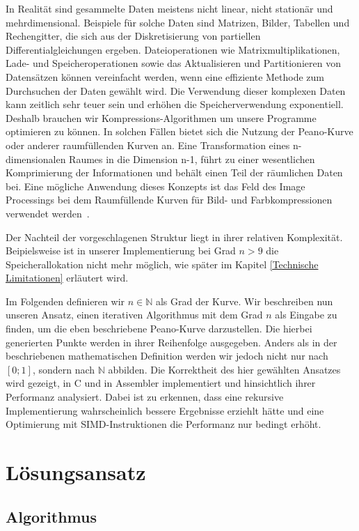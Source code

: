 \documentclass[course=asp]{aspdoc}
\begin{document}
In Realit\"at sind gesammelte Daten meistens nicht linear, nicht station\"ar und mehrdimensional. Beispiele f\"ur solche Daten sind Matrizen, Bilder, Tabellen und Rechengitter, die sich aus der Diskretisierung von partiellen Differentialgleichungen ergeben. Dateioperationen wie Matrixmultiplikationen, Lade- und Speicheroperationen sowie das Aktualisieren und Partitionieren von Datens\"atzen k\"onnen vereinfacht werden, wenn eine effiziente Methode zum Durchsuchen der Daten gew\"ahlt wird. Die Verwendung dieser komplexen Daten kann zeitlich sehr teuer sein und erh\"ohen die Speicherverwendung exponentiell. Deshalb brauchen wir Kompressions-Algorithmen um unsere Programme optimieren zu k\"onnen. In solchen F\"allen bietet sich die Nutzung der Peano-Kurve oder anderer raumf\"ullenden Kurven an. Eine Transformation eines n-dimensionalen Raumes in die Dimension n-1, f\"uhrt zu einer wesentlichen Komprimierung der Informationen und beh\"alt einen Teil der r\"aumlichen Daten bei. Eine m\"ogliche Anwendung dieses Konzepts ist das Feld des Image Processings bei dem Raumf\"ullende Kurven f\"ur Bild- und Farbkompressionen verwendet werden~\cite{imageProcessing}.

Der Nachteil der vorgeschlagenen Struktur liegt in ihrer relativen Komplexit\"at. Beipielsweise ist in unserer Implementierung bei Grad $n > 9$ die Speicherallokation nicht mehr m\"oglich, wie sp\"ater im Kapitel \ref{Technische Limitationen} erl\"autert wird.

Im Folgenden definieren wir $n \in \mathbb{N}$ als Grad der Kurve.
Wir beschreiben nun unseren Ansatz, einen iterativen Algorithmus mit dem Grad $n$ als Eingabe zu finden, um die eben beschriebene Peano-Kurve darzustellen. Die hierbei generierten Punkte werden in ihrer Reihenfolge ausgegeben. Anders als in der beschriebenen mathematischen Definition werden wir jedoch nicht nur nach $[0;1]$, sondern nach $\mathbb{N}$ abbilden.
Die Korrektheit des hier gew\"ahlten Ansatzes wird gezeigt, in C und in Assembler implementiert und hinsichtlich ihrer Performanz analysiert. Dabei ist zu erkennen, dass eine rekursive Implementierung wahrscheinlich bessere Ergebnisse erziehlt h\"atte und eine Optimierung mit SIMD-Instruktionen die Performanz nur bedingt erh\"oht.

\section{L\"osungsansatz} \label{L\"osungsansatz}

\subsection{Algorithmus} \label{Algorithmus}
\end{document}
